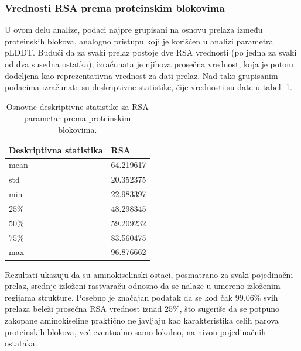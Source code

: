 \documentclass[a4paper,12pt]{article}
\begin{document}
\subsubsection{Vrednosti RSA prema proteinskim blokovima}
U ovom delu analize, podaci najpre grupisani na osnovu prelaza između proteinskih blokova, analogno pristupu koji je korišćen u analizi parametra pLDDT. Budući da za svaki prelaz postoje dve RSA vrednosti (po jedna za svaki od dva susedna ostatka), izračunata je njihova prosečna vrednost, koja je potom dodeljena kao reprezentativna vrednost za dati prelaz. Nad tako grupisanim podacima izračunate su deskriptivne statistike, čije vrednosti su date u tabeli \ref{Tabela:10}.
\begin{table}[h!]
    \centering
    \begin{tabular}{ |l|l| } 
    \hline
    \textbf{Deskriptivna statistika} & \textbf{RSA} \\
    \hline
    mean & 64.219617 \\
    std  & 20.352375 \\
    min  & 22.983397 \\
    $25\%$  & 48.298345 \\
    $50\%$  & 59.209232 	\\
    $75\%$ & 83.560475\\
    max & 96.876662 	\\
    \hline
    \end{tabular}
    \caption{Osnovne deskriptivne statistike za RSA parametar prema proteinskim blokovima.}
    \label{Tabela:10}
\end{table}

Rezultati ukazuju da su aminokiselinski ostaci, posmatrano za svaki pojedinačni prelaz, srednje izloženi rastvaraču odnosno da se nalaze u umereno izloženim regijama strukture. Posebno je značajan podatak da se kod čak $99.06\%$ svih prelaza beleži prosečna RSA vrednost iznad $25\%$, što sugeriše da se potpuno zakopane aminokiseline praktično ne javljaju kao karakteristika celih parova proteinskih blokova, već eventualno samo lokalno, na nivou pojedinačnih ostataka.
\end{document}
